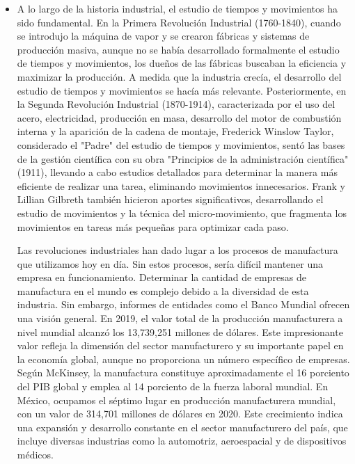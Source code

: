     \begin{itemize}
        \item A lo largo de la historia industrial, el estudio de tiempos y movimientos ha sido fundamental. En la Primera Revolución Industrial (1760-1840), cuando se introdujo la máquina de vapor y se crearon fábricas y sistemas de producción masiva, aunque no se había desarrollado formalmente el estudio de tiempos y movimientos, los dueños de las fábricas buscaban la eficiencia y maximizar la producción. A medida que la industria crecía, el desarrollo del estudio de tiempos y movimientos se hacía más relevante. Posteriormente, en la Segunda Revolución Industrial (1870-1914), caracterizada por el uso del acero, electricidad, producción en masa, desarrollo del motor de combustión interna y la aparición de la cadena de montaje, Frederick Winslow Taylor, considerado el "Padre" del estudio de tiempos y movimientos, sentó las bases de la gestión científica con su obra "Principios de la administración científica" (1911), llevando a cabo estudios detallados para determinar la manera más eficiente de realizar una tarea, eliminando movimientos innecesarios. Frank y Lillian Gilbreth también hicieron aportes significativos, desarrollando el estudio de movimientos y la técnica del micro-movimiento, que fragmenta los movimientos en tareas más pequeñas para optimizar cada paso.
    
    Las revoluciones industriales han dado lugar a los procesos de manufactura que utilizamos hoy en día. Sin estos procesos, sería difícil mantener una empresa en funcionamiento. Determinar la cantidad de empresas de manufactura en el mundo es complejo debido a la diversidad de esta industria. Sin embargo, informes de entidades como el Banco Mundial ofrecen una visión general. En 2019, el valor total de la producción manufacturera a nivel mundial alcanzó los 13,739,251 millones de dólares. Este impresionante valor refleja la dimensión del sector manufacturero y su importante papel en la economía global, aunque no proporciona un número específico de empresas. Según McKinsey, la manufactura constituye aproximadamente el 16 porciento del PIB global y emplea al 14 porciento de la fuerza laboral mundial. En México, ocupamos el séptimo lugar en producción manufacturera mundial, con un valor de 314,701 millones de dólares en 2020. Este crecimiento indica una expansión y desarrollo constante en el sector manufacturero del país, que incluye diversas industrias como la automotriz, aeroespacial y de dispositivos médicos.
    

\end{itemize}
